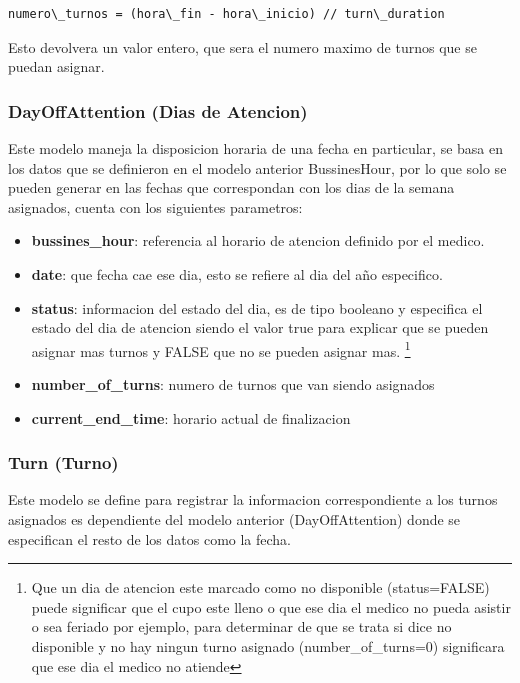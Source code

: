 \begin{lstlisting}
numero\_turnos = (hora\_fin - hora\_inicio) // turn\_duration
\end{lstlisting}

Esto devolvera un valor entero, que sera el numero maximo de turnos que se 
puedan asignar.


\subsubsection{DayOffAttention (Dias de Atencion)}

Este modelo maneja la disposicion horaria de una fecha en particular, se basa 
en los datos que se definieron en el modelo anterior BussinesHour, por lo que 
solo se pueden generar en las fechas que correspondan con los dias de la semana
asignados, cuenta con los siguientes parametros:

\begin{itemize}
    \item \textbf{bussines\_hour}: referencia al horario de atencion definido 
        por el medico.
    \item \textbf{date}: que fecha cae ese dia, esto se refiere al dia del a\~no 
        especifico.
    \item \textbf{status}: informacion del estado del dia, es de tipo booleano
        y especifica el estado del dia de atencion siendo el valor true 
        para explicar que se pueden asignar mas turnos y FALSE que no se 
        pueden asignar mas. \footnote{ Que un dia de atencion este marcado como 
        no disponible (status=FALSE) puede significar que el cupo este lleno o 
        que ese dia el medico no pueda asistir o sea feriado por ejemplo, para 
        determinar de que se trata si dice no disponible y no hay ningun turno 
        asignado (number\_of\_turns=0) significara que ese dia el medico no 
        atiende }
     \item \textbf{number\_of\_turns}: numero de turnos que van siendo asignados
     \item \textbf{current\_end\_time}: horario actual de finalizacion 
\end{itemize}


\subsubsection{Turn (Turno)}

Este modelo se define para registrar la informacion correspondiente a los 
turnos asignados es dependiente del modelo anterior (DayOffAttention) donde se 
especifican el resto de los datos como la fecha.

